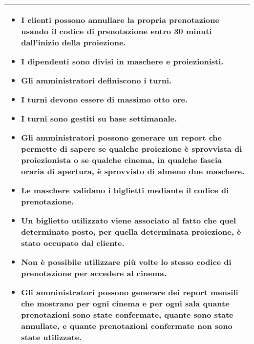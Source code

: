 \begin{tabularx}{\linewidth}{|X|}
\begin{itemize}
        \item I clienti possono annullare la propria prenotazione usando il
              codice di prenotazione entro 30 minuti dall'inizio della
              proiezione.
        \item I dipendenti sono divisi in maschere e proiezionisti.
        \item Gli amministratori definiscono i turni.
        \item I turni devono essere di massimo otto ore.
        \item I turni sono gestiti su base settimanale.
        \item Gli amministratori possono generare un report che permette di
              sapere se qualche proiezione è sprovvista di proiezionista o se
              qualche cinema, in qualche fascia oraria di apertura, è sprovvisto
              di almeno due maschere.
        \item Le maschere validano i biglietti mediante il codice
              di prenotazione.
        \item Un biglietto utilizzato viene associato al fatto che quel
              determinato posto, per quella determinata proiezione, è stato
              occupato dal cliente.
        \item Non è possibile utilizzare più volte lo stesso codice di
              prenotazione per accedere al cinema.
        \item Gli amministratori possono generare dei report mensili che
              mostrano per ogni cinema e per ogni sala quante prenotazioni
              sono state confermate, quante sono state annullate, e quante
              prenotazioni confermate non sono state utilizzate.
    \end{itemize}
    \\\hline
\end{tabularx}

\pagebreak


